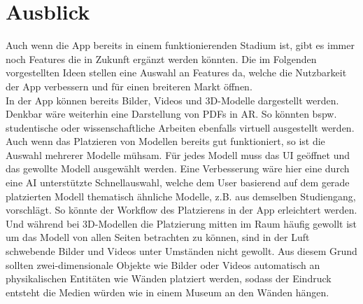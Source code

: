 \documentclass[titlepage, a4paper, 11pt]{scrartcl}
\begin{document}
      \section{Ausblick}
        Auch wenn die App bereits in einem funktionierenden Stadium ist, gibt es immer noch Features die in Zukunft ergänzt werden könnten. 
        Die im Folgenden vorgestellten Ideen stellen eine Auswahl an Features da, welche die Nutzbarkeit der App verbessern und für einen breiteren Markt öffnen.\\
        In der App können bereits Bilder, Videos und 3D-Modelle dargestellt werden. Denkbar wäre weiterhin eine Darstellung von PDFs in AR. 
        So könnten bspw. studentische oder wissenschaftliche Arbeiten ebenfalls virtuell ausgestellt werden.\\
        Auch wenn das Platzieren von Modellen bereits gut funktioniert, so ist die Auswahl mehrerer Modelle mühsam. 
        Für jedes Modell muss das UI geöffnet und das gewollte Modell ausgewählt werden. 
        Eine Verbesserung wäre hier eine durch eine AI unterstützte Schnellauswahl, welche dem User basierend auf dem gerade platzierten Modell thematisch ähnliche Modelle, z.B. aus demselben Studiengang, vorschlägt. 
        So könnte der Workflow des Platzierens in der App erleichtert werden.\\
        Und während bei 3D-Modellen die Platzierung mitten im Raum häufig gewollt ist um das Modell von allen Seiten betrachten zu können, sind in der Luft schwebende Bilder und Videos unter Umständen nicht gewollt. 
        Aus diesem Grund sollten zwei-dimensionale Objekte wie Bilder oder Videos automatisch an physikalischen Entitäten wie Wänden platziert werden, sodass der Eindruck entsteht die Medien würden wie in einem Museum an den Wänden hängen.\\
\end{document}
